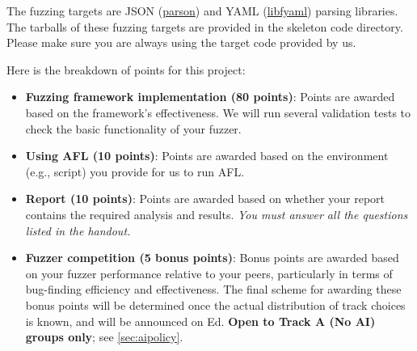\documentclass[letterpaper,11pt]{article}
\begin{document}
The fuzzing targets are JSON (\href{https://github.com/kgabis/parson}{parson}) and YAML (\href{https://github.com/pantoniou/libfyaml/tree/master}{libfyaml}) parsing libraries.
The tarballs of these fuzzing targets are provided in the skeleton code directory.
Please make sure you are always using the target code provided by us.



Here is the breakdown of points for this project:

\begin{itemize}
    \item \textbf{Fuzzing framework implementation (80 points)}:  Points are awarded based on the framework's effectiveness. We will run several validation tests to check the basic functionality of your fuzzer.

    \item \textbf{Using AFL (10 points)}: Points are awarded based on the environment (e.g., script) you provide for us to run AFL.

    \item \textbf{Report (10 points)}: Points are awarded based on whether your report contains the required analysis and results. \textit{You must answer all the questions listed in the handout.}

    \item \textbf{Fuzzer competition (5 bonus points)}: Bonus points are awarded based on your fuzzer performance relative to your peers, particularly in terms of bug-finding efficiency and effectiveness. The final scheme for awarding these bonus points will be determined once the actual distribution of track choices is known, and will be announced on Ed. \textbf{Open to Track A (No AI) groups only}; see \autoref{sec:aipolicy}.
\end{itemize}
\end{document}
